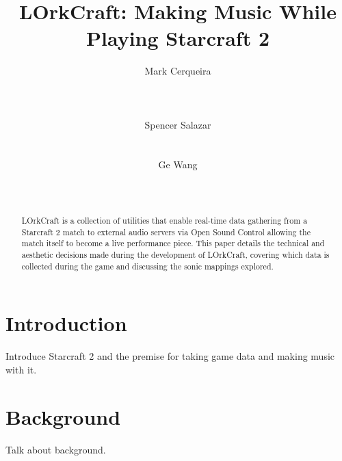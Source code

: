 \documentclass{nime-document-class}
\begin{document}

\newcommand{\projectName}{LOrkCraft}

\title{\projectName{}: Making Music While Playing Starcraft 2}

\author{
\alignauthor
Mark Cerqueira\\
       \\
       \\
       \\
\alignauthor
Spencer Salazar\\
       \\
       \\
\alignauthor
Ge Wang\\
       \\
       \\
}

\maketitle
\begin{abstract}
\projectName{} is a collection of utilities that enable real-time data gathering from a Starcraft 2 match to external audio servers via Open Sound Control allowing the match itself to become a live performance piece. This paper details the technical and aesthetic decisions made during the development of \projectName{}, covering which data is collected during the game and discussing the sonic mappings explored.
\end{abstract}


\section{Introduction}
Introduce Starcraft 2 and the premise for taking game data and making music with it.

\section{Background}
Talk about background.
\end{document}
